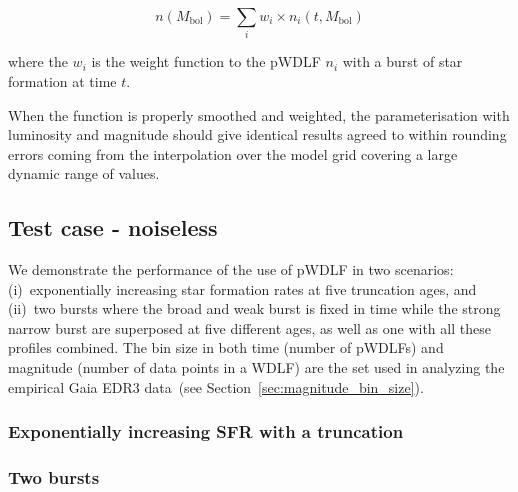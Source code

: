 \documentclass[fleqn,usenatbib]{mnras}
\begin{document}
\begin{equation}
    n(M_\mathrm{bol}) = \sum_i w_i \times n_i(t, M_\mathrm{bol})    
\end{equation}

where the $w_i$ is the weight function to the pWDLF $n_i$ with a
burst of star formation at time $t$.

When the function is properly smoothed and weighted, the
parameterisation with luminosity and magnitude should give identical
results agreed to within rounding errors coming from the interpolation
over the model grid covering a large dynamic range of values.

\subsection{Test case - noiseless}

We demonstrate the performance of the use of pWDLF in two scenarios:
(i)~exponentially increasing star formation rates at five truncation
ages, and (ii)~two bursts where the broad and weak burst is fixed in
time while the strong narrow burst are superposed at five different
ages, as well as one with all these profiles combined. The bin size
in both time (number of pWDLFs) and magnitude (number of data points
in a WDLF) are the set used in analyzing the empirical Gaia EDR3
data~(see Section~\ref{sec:magnitude_bin_size}).

\subsubsection*{Exponentially increasing SFR with a truncation}

\subsubsection*{Two bursts}
\end{document}
